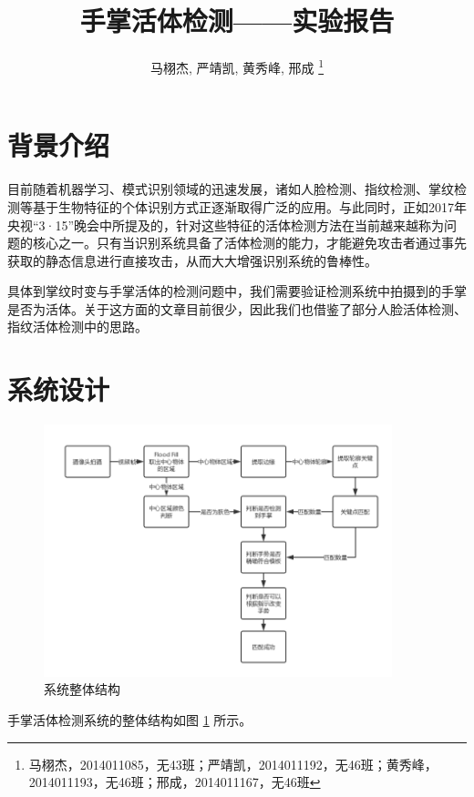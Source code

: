 \documentclass[UTF8, a4paper, fontset=none]{article}
\begin{document}
\title{手掌活体检测——实验报告}
\author{马栩杰, 严靖凯, 黄秀峰, 邢成 \footnote{马栩杰，2014011085，无43班；严靖凯，2014011192，无46班；黄秀峰，2014011193，无46班；邢成，2014011167，无46班}}
\maketitle

\section{背景介绍}

目前随着机器学习、模式识别领域的迅速发展，诸如人脸检测、指纹检测、掌纹检测等基于生物特征的个体识别方式正逐渐取得广泛的应用。与此同时，正如2017年央视“3·15”晚会中所提及的，针对这些特征的活体检测方法在当前越来越称为问题的核心之一。只有当识别系统具备了活体检测的能力，才能避免攻击者通过事先获取的静态信息进行直接攻击，从而大大增强识别系统的鲁棒性。

具体到掌纹时变与手掌活体的检测问题中，我们需要验证检测系统中拍摄到的手掌是否为活体。关于这方面的文章目前很少，因此我们也借鉴了部分人脸活体检测、指纹活体检测中的思路。

\section{系统设计}

\begin{figure}
    \centering
    \includegraphics[width=0.9\textwidth]{./system.png}
    \caption{系统整体结构}
    \label{system}
\end{figure}

手掌活体检测系统的整体结构如图 \ref{system} 所示。
\end{document}
